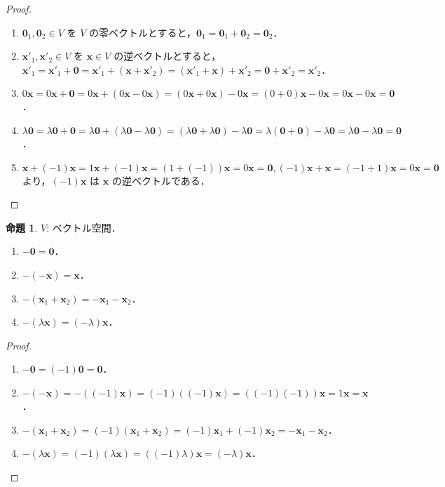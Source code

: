 \documentclass{jlreq}
\theoremstyle{definition}
\newtheorem{prop}[thm]{命題}
\begin{document}
      \begin{proof}
        \mbox{}
        \begin{enumerate}
          \item $\bm{0}_1, \bm{0}_2 \in V$ を $V$ の零ベクトルとすると，$\bm{0}_1 = \bm{0}_1+\bm{0}_2 = \bm{0}_2$．
          \item $\bm{x}'_1, \bm{x}'_2 \in V$ を $\bm{x} \in V$ の逆ベクトルとすると，$\bm{x}'_1 = \bm{x}'_1+\bm{0} = \bm{x}'_1+(\bm{x}+\bm{x}'_2) = (\bm{x}'_1+\bm{x})+\bm{x}'_2 = \bm{0}+\bm{x}'_2 = \bm{x}'_2$．
          \item $0\bm{x} = 0\bm{x}+\bm{0} = 0\bm{x}+(0\bm{x}-0\bm{x})=(0\bm{x}+0\bm{x})-0\bm{x}=(0+0)\bm{x}-0\bm{x}=0\bm{x}-0\bm{x}=\bm{0}$．
          \item $\lambda\bm{0}=\lambda\bm{0}+\bm{0}=\lambda\bm{0}+(\lambda\bm{0}-\lambda\bm{0})=(\lambda\bm{0}+\lambda\bm{0})-\lambda\bm{0}=\lambda(\bm{0}+\bm{0})-\lambda\bm{0}=\lambda\bm{0}-\lambda\bm{0}=\bm{0}$．
          \item $\bm{x}+(-1)\bm{x}=1\bm{x}+(-1)\bm{x}=(1+(-1))\bm{x}=0\bm{x}=\bm{0}, (-1)\bm{x}+\bm{x}=(-1+1)\bm{x}=0\bm{x}=\bm{0}$ より，$(-1)\bm{x}$ は $\bm{x}$ の逆ベクトルである．
        \end{enumerate}
      \end{proof}
      \begin{prop}
        $V$: ベクトル空間． 
        \begin{enumerate}
          \item $-\bm{0}=\bm{0}$．
          \item $-(-\bm{x})=\bm{x}$．
          \item $-(\bm{x}_1+\bm{x}_2)=-\bm{x}_1-\bm{x}_2$．
          \item $-(\lambda\bm{x})=(-\lambda)\bm{x}$．
        \end{enumerate}
      \end{prop}
      \begin{proof}
        \mbox{}
        \begin{enumerate}
          \item $-\bm{0}=(-1)\bm{0}=\bm{0}$．
          \item $-(-\bm{x})=-((-1)\bm{x})=(-1)((-1)\bm{x})=((-1)(-1))\bm{x}=1\bm{x}=\bm{x}$．
          \item $-(\bm{x}_1+\bm{x}_2)=(-1)(\bm{x}_1+\bm{x}_2)=(-1)\bm{x}_1+(-1)\bm{x}_2=-\bm{x}_1-\bm{x}_2$．
          \item $-(\lambda\bm{x})=(-1)(\lambda\bm{x})=((-1)\lambda)\bm{x}=(-\lambda)\bm{x}$．
        \end{enumerate}
      \end{proof}
\end{document}
